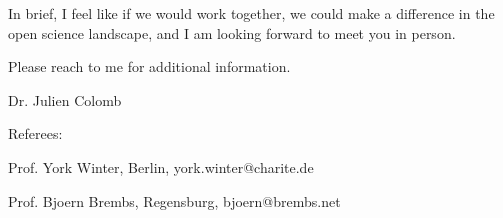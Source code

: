 In brief, I feel like if we would work together, we could make a difference in the open science landscape,
and I am looking forward to meet you in person.

Please reach to me for additional information.

Dr. Julien Colomb


\vspace {1.cm} 

Referees:

Prof. York Winter, Berlin, york.winter@charite.de
 
 
Prof. Bjoern Brembs, Regensburg, bjoern@brembs.net
